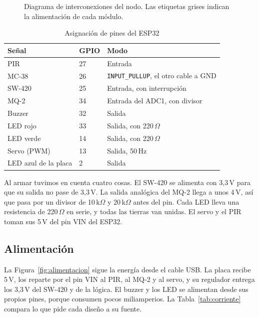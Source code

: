 \documentclass[manuscript,screen,nonacm]{acmart}
\begin{document}
\begin{figure}[htbp]
\centering
{}
\caption{Diagrama de interconexiones del nodo. Las etiquetas grises indican la alimentación de cada módulo.}
\label{fig:conexiones}
\end{figure}

\begin{table}[htbp]
\centering
\caption{Asignación de pines del ESP32}
\label{tab:pines}
\footnotesize
\renewcommand{\arraystretch}{1.15}
\begin{tabular}{@{}lll@{}}
\toprule
\textbf{Señal} & \textbf{GPIO} & \textbf{Modo} \\
\midrule
PIR & 27 & Entrada \\
MC-38 & 26 & \texttt{INPUT\_PULLUP}, el otro cable a GND \\
SW-420 & 25 & Entrada, con interrupción \\
MQ-2 & 34 & Entrada del ADC1, con divisor \\
Buzzer & 32 & Salida \\
LED rojo & 33 & Salida, con 220\,$\Omega$ \\
LED verde & 14 & Salida, con 220\,$\Omega$ \\
Servo (PWM) & 13 & Salida, 50\,Hz \\
LED azul de la placa & 2 & Salida \\
\bottomrule
\end{tabular}
\end{table}

Al armar tuvimos en cuenta cuatro cosas. El SW-420 se alimenta con 3,3\,V para que su salida no pase de 3,3\,V. La salida analógica del MQ-2 llega a unos 4\,V, así que pasa por un divisor de 10\,k$\Omega$ y 20\,k$\Omega$ antes del pin. Cada LED lleva una resistencia de 220\,$\Omega$ en serie, y todas las tierras van unidas. El servo y el PIR toman sus 5\,V del pin VIN del ESP32.

\subsection{Alimentación}
La Figura~\ref{fig:alimentacion} sigue la energía desde el cable USB. La placa recibe 5\,V, los reparte por el pin VIN al PIR, al MQ-2 y al servo, y su regulador entrega los 3,3\,V del SW-420 y de la lógica. El buzzer y los LED se alimentan desde sus propios pines, porque consumen pocos miliamperios. La Tabla~\ref{tab:corriente} compara lo que pide cada diseño a su fuente.
\end{document}
